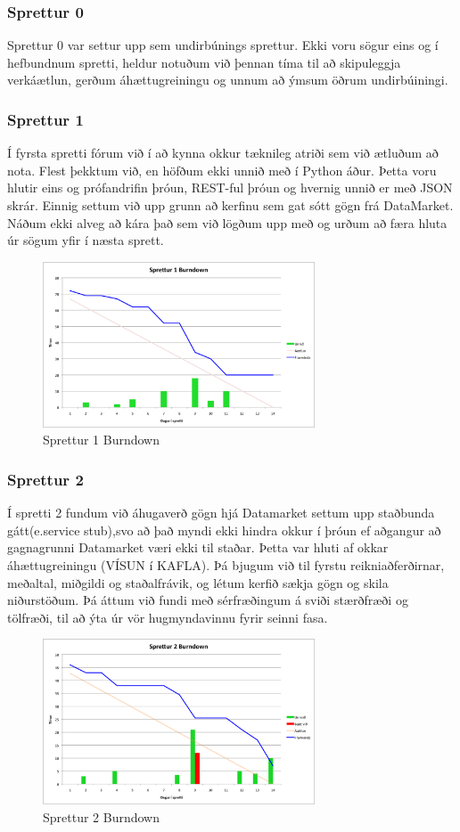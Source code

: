 \documentclass{article}
\begin{document}
\subsubsection{Sprettur 0}
Sprettur 0 var settur upp sem undirbúnings sprettur. Ekki voru sögur eins og í
hefbundnum spretti, heldur notuðum við þennan tíma til að 
skipuleggja verkáætlun, gerðum áhættugreiningu og unnum að ýmsum öðrum
undirbúiningi.
\subsubsection{Sprettur 1}
Í fyrsta spretti fórum við í að kynna okkur tæknileg atriði sem við ætluðum að
nota.
Flest þekktum við, en höfðum ekki unnið með í Python áður. Þetta voru hlutir
eins og prófandrifin þróun, REST-ful þróun og hvernig 
unnið er með JSON skrár. Einnig settum við upp grunn að kerfinu sem gat sótt
gögn frá DataMarket. Náðum ekki alveg að kára það sem við lögðum 
upp með og urðum að færa hluta úr sögum yfir í næsta sprett.
\begin{figure}[H]
  \centering
  \includegraphics[width=0.72\textwidth]{Sprettur1_Burndown.png}
  \caption{Sprettur 1 Burndown}
\end{figure}

\subsubsection{Sprettur 2}
Í spretti 2 fundum við áhugaverð gögn hjá Datamarket settum upp staðbunda
gátt(e.service stub),svo að það myndi ekki hindra okkur í þróun ef 
aðgangur að gagnagrunni Datamarket væri ekki til staðar. Þetta var hluti af
okkar áhættugreiningu (VÍSUN í KAFLA). 
Þá bjugum við til fyrstu reikniaðferðirnar, meðaltal, miðgildi og staðalfrávik,
og létum kerfið sækja gögn og skila niðurstöðum.
Þá áttum við fundi með sérfræðingum á sviði stærðfræði og tölfræði, til að ýta
úr vör hugmyndavinnu fyrir seinni fasa.
\begin{figure}[H]
 \centering
 \includegraphics[width=0.72\textwidth]{Sprettur2_Burndown.png}
 \caption{Sprettur 2 Burndown}
\end{figure}
\end{document}
